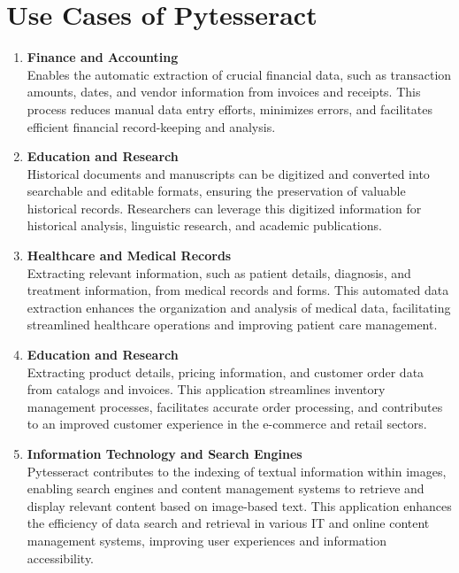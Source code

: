 \section{Use Cases of Pytesseract}
\begin{enumerate}
	\item \textbf{Finance and Accounting}\\
	Enables the automatic extraction of crucial financial data, such as transaction amounts, dates, and vendor information from invoices and receipts. This process reduces manual data entry efforts, minimizes errors, and facilitates efficient financial record-keeping and analysis.
	
	\item \textbf{Education and Research}\\
	Historical documents and manuscripts can be digitized and converted into searchable and editable formats, ensuring the preservation of valuable historical records. Researchers can leverage this digitized information for historical analysis, linguistic research, and academic publications.
	
	\item \textbf{Healthcare and Medical Records}\\
	Extracting relevant information, such as patient details, diagnosis, and treatment information, from medical records and forms. This automated data extraction enhances the organization and analysis of medical data, facilitating streamlined healthcare operations and improving patient care management.
	
	\item \textbf{Education and Research}\\
	Extracting product details, pricing information, and customer order data from catalogs and invoices. This application streamlines inventory management processes, facilitates accurate order processing, and contributes to an improved customer experience in the e-commerce and retail sectors.
	
	\item \textbf{Information Technology and Search Engines}\\
	Pytesseract contributes to the indexing of textual information within images, enabling search engines and content management systems to retrieve and display relevant content based on image-based text. This application enhances the efficiency of data search and retrieval in various IT and online content management systems, improving user experiences and information accessibility.
\end{enumerate}



